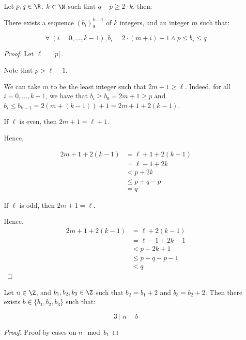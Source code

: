 \begin{lemma}[blist]
    \label{lem:blist}
    \leanok
    Let $p,q\in\R$, $k\in\N$ such that $q - p \geq 2 \cdot k$, then:

    There exists a sequence $(b_i)_0^{k-1}$ of $k$ integers, and an integer $m$ such that:

    \[
        \forall\ (i = 0, \dots, k-1), b_i = 2 \cdot (m + i) + 1\land  p\leq b_i \leq q
    \]
\end{lemma}

\begin{proof}
    \leanok
    Let $\ell = \lceil p \rceil.$

    Note that $p > \ell - 1$.

    We can take $m$ to be the least integer such that $2m + 1 \geq \ell$. Indeed, for all $i = 0,\ldots,k-1$, we have that $b_i \geq b_0 = 2m + 1 \geq p$ and $b_i \leq b_{k-1} = 2(m+(k-1))+ 1 = 2m+1+2(k-1).$
    
    If $\ell$ is even, then $2m+1 = \ell + 1$.

    Hence, 
    
    \begin{align*}
        2m+1+2(k-1) &= \ell + 1 + 2(k-1) \\
        &= \ell - 1 + 2k \\
        &< p + 2k \\
        &\leq p + q - p \\
        &= q    
    \end{align*}

    If $\ell$ is odd, then $2m+1 = \ell$.
    
    Hence,
    \begin{align*}
        2m+1+2(k-1) &= \ell + 2(k-1)\\
        &= \ell - 1 + 2k - 1 \\
        &< p + 2k + 1 \\
        &\leq p + q - p - 1 \\
        &< q
    \end{align*}
\end{proof}

\begin{lemma}[res b]
    \label{lemma:res_b}
    \leanok
    Let $n\in\Z$, and $b_1,b_2,b_3\in\Z$ such that $b_2 = b_1 + 2$ and $b_3 = b_2 + 2$.
    Then there exists $b\in\{b_1,b_2,b_3\}$ such that:

    \[
        3 \mid n-b
    \]
\end{lemma}
\begin{proof}
    Proof by cases on $n \mod b_1$
\end{proof}


